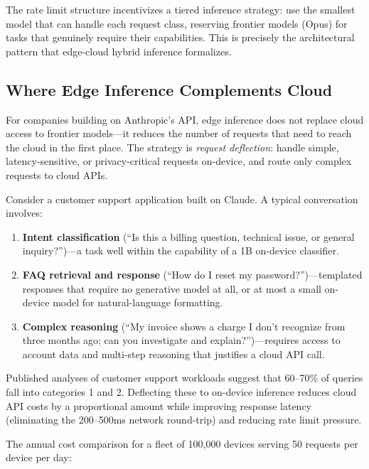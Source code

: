 \documentclass[12pt, letterpaper, twoside]{report}
\begin{document}
The rate limit structure incentivizes a tiered inference strategy: use the smallest model that can handle each request class, reserving frontier models (Opus) for tasks that genuinely require their capabilities. This is precisely the architectural pattern that edge-cloud hybrid inference formalizes.

\subsection{Where Edge Inference Complements Cloud}

For companies building on Anthropic's API, edge inference does not replace cloud access to frontier models---it reduces the number of requests that need to reach the cloud in the first place. The strategy is \textit{request deflection}: handle simple, latency-sensitive, or privacy-critical requests on-device, and route only complex requests to cloud APIs.

Consider a customer support application built on Claude. A typical conversation involves:

\begin{enumerate}[itemsep=3pt]
\item \textbf{Intent classification} (``Is this a billing question, technical issue, or general inquiry?'')---a task well within the capability of a 1B on-device classifier.
\item \textbf{FAQ retrieval and response} (``How do I reset my password?'')---templated responses that require no generative model at all, or at most a small on-device model for natural-language formatting.
\item \textbf{Complex reasoning} (``My invoice shows a charge I don't recognize from three months ago; can you investigate and explain?'')---requires access to account data and multi-step reasoning that justifies a cloud API call.
\end{enumerate}

Published analyses of customer support workloads suggest that 60--70\% of queries fall into categories 1 and 2. Deflecting these to on-device inference reduces cloud API costs by a proportional amount while improving response latency (eliminating the 200--500ms network round-trip) and reducing rate limit pressure.

The annual cost comparison for a fleet of 100,000 devices serving 50 requests per device per day:
\end{document}
